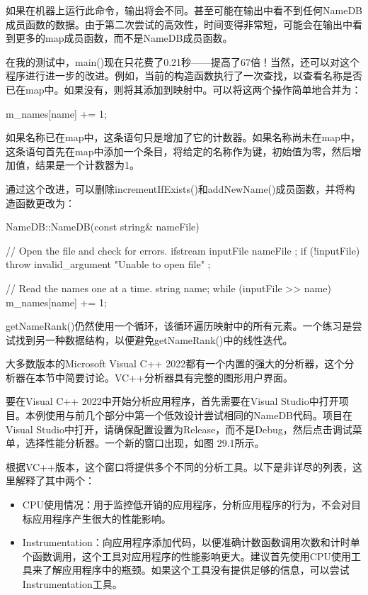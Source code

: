 如果在机器上运行此命令，输出将会不同。甚至可能在输出中看不到任何NameDB成员函数的数据。由于第二次尝试的高效性，时间变得非常短，可能会在输出中看到更多的map成员函数，而不是NameDB成员函数。

在我的测试中，main()现在只花费了0.21秒——提高了67倍！当然，还可以对这个程序进行进一步的改进。例如，当前的构造函数执行了一次查找，以查看名称是否已在map中。如果没有，则将其添加到映射中。可以将这两个操作简单地合并为：

\begin{cpp}
m_names[name] += 1;
\end{cpp}

如果名称已在map中，这条语句只是增加了它的计数器。如果名称尚未在map中，这条语句首先在map中添加一个条目，将给定的名称作为键，初始值为零，然后增加值，结果是一个计数器为1。

通过这个改进，可以删除incrementIfExists()和addNewName()成员函数，并将构造函数更改为：

\begin{cpp}
NameDB::NameDB(const string& nameFile)
{
    // Open the file and check for errors.
    ifstream inputFile { nameFile };
    if (!inputFile) {
        throw invalid_argument { "Unable to open file" };
    }

    // Read the names one at a time.
    string name;
    while (inputFile >> name) {
        m_names[name] += 1;
    }
}
\end{cpp}

getNameRank()仍然使用一个循环，该循环遍历映射中的所有元素。一个练习是尝试找到另一种数据结构，以便避免getNameRank()中的线性迭代。


大多数版本的Microsoft Visual C++ 2022都有一个内置的强大的分析器，这个分析器在本节中简要讨论。VC++分析器具有完整的图形用户界面。

要在Visual C++ 2022中开始分析应用程序，首先需要在Visual Studio中打开项目。本例使用与前几个部分中第一个低效设计尝试相同的NameDB代码。项目在Visual Studio中打开，请确保配置设置为Release，而不是Debug，然后点击调试菜单，选择性能分析器。一个新的窗口出现，如图 29.1所示。


根据VC++版本，这个窗口将提供多个不同的分析工具。以下是非详尽的列表，这里解释了其中两个：

\begin{itemize}
\item
CPU使用情况：用于监控低开销的应用程序，分析应用程序的行为，不会对目标应用程序产生很大的性能影响。

\item
Instrumentation：向应用程序添加代码，以便准确计数函数调用次数和计时单个函数调用，这个工具对应用程序的性能影响更大。建议首先使用CPU使用工具来了解应用程序中的瓶颈。如果这个工具没有提供足够的信息，可以尝试Instrumentation工具。
\end{itemize}

